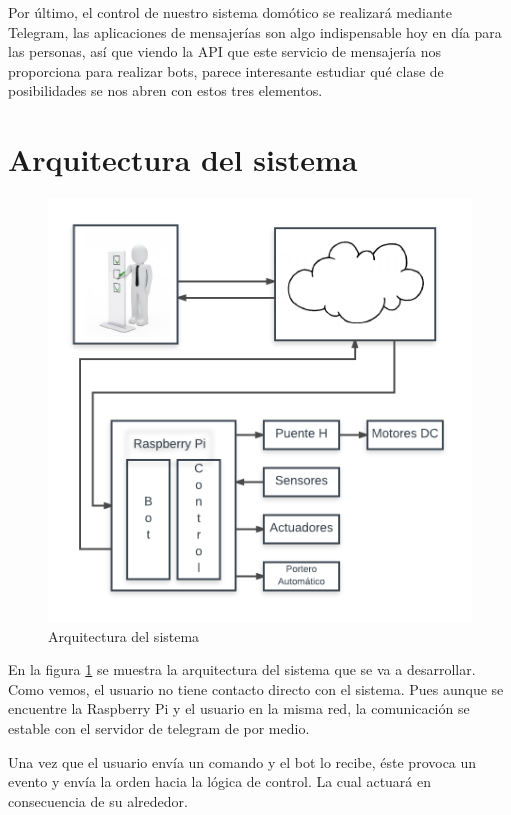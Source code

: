 \documentclass[10pt,journal,compsoc]{IEEEtran}
\begin{document}
Por último, el control de nuestro sistema domótico se realizará mediante Telegram, las aplicaciones 
de mensajerías son algo indispensable hoy en día para las personas, así que viendo la API que este 
servicio de mensajería nos proporciona para realizar bots, parece interesante estudiar qué clase de 
posibilidades se nos abren con estos tres elementos.

\section{Arquitectura del sistema}
\begin{figure}[h]
\centering
\includegraphics[scale=0.5]{ArqSist}
\caption{Arquitectura del sistema}
\label{fig:arqSist}
\end{figure}

En la figura \ref{fig:arqSist} se muestra la arquitectura del sistema que se va a desarrollar. 
Como vemos, el usuario no tiene contacto directo con el sistema. Pues aunque se encuentre la 
Raspberry Pi y el usuario en la misma red, la comunicación se estable con el servidor de telegram 
de por medio.

Una vez que el usuario envía un comando y el bot lo recibe, éste provoca un evento y envía 
la orden hacia la lógica de control. La cual actuará en consecuencia de su alrededor.
\end{document}
